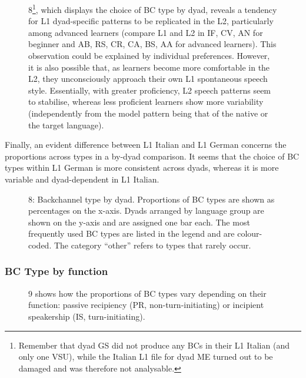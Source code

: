 \begin{figure}
\caption{8\footnote{Remember that dyad GS did not produce any BCs in their L1 Italian (and only one VSU), while the Italian L1 file for dyad ME turned out to be damaged and was therefore not analysable.}, which displays the choice of BC type by dyad, reveals a tendency for L1 dyad-specific patterns to be replicated in the L2, particularly among advanced learners (compare L1 and L2 in IF, CV, AN for beginner and AB, RS, CR, CA, BS, AA for advanced learners). This observation could be explained by individual preferences. However, it is also possible that, as learners become more comfortable in the L2, they unconsciously approach their own L1 spontaneous speech style. Essentially, with greater proficiency, L2 speech patterns seem to stabilise, whereas less proficient learners show more variability (independently from the model pattern being that of the native or the target language).}
\label{fig:key:4}
\end{figure}

Finally, an evident difference between L1 Italian and L1 German concerns the proportions across types in a by-dyad comparison. It seems that the choice of BC types within L1 German is more consistent across dyads, whereas it is more variable and dyad-dependent in L1 Italian.

\begin{stylecaption}
  
 
\end{stylecaption}

\begin{stylecaption}\begin{figure}
\caption{8: Backchannel type by dyad. Proportions of BC types are shown as percentages on the x-axis. Dyads arranged by language group are shown on the y-axis and are assigned one bar each. The most frequently used BC types are listed in the legend and are colour-coded. The category “other” refers to types that rarely occur.}
\label{fig:key:4}
\end{figure}\end{stylecaption}

\subsubsection{  BC Type by function}
\hypertarget{Toc191305955}{}\begin{figure}
\caption{9 shows how the proportions of BC types vary depending on their function: passive recipiency (PR, non-turn-initiating) or incipient speakership (IS, turn-initiating).}
\label{fig:key:4}
\end{figure}

